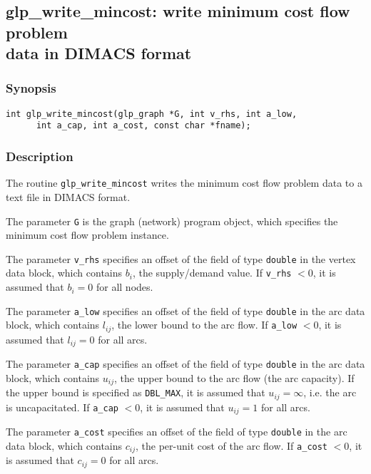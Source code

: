 \newpage

\subsection{glp\_write\_mincost: write minimum cost flow problem\\data
in DIMACS format}

\subsubsection*{Synopsis}

\begin{verbatim}
int glp_write_mincost(glp_graph *G, int v_rhs, int a_low,
      int a_cap, int a_cost, const char *fname);
\end{verbatim}

\subsubsection*{Description}

The routine \verb|glp_write_mincost| writes the minimum cost flow
problem data to a text file in DIMACS format.

The parameter \verb|G| is the graph (network) program object, which
specifies the minimum cost flow problem instance.

The parameter \verb|v_rhs| specifies an offset of the field of type
\verb|double| in the vertex data block, which contains $b_i$, the
supply/demand value. If \verb|v_rhs| $<0$, it is assumed that $b_i=0$
for all nodes.

The parameter \verb|a_low| specifies an offset of the field of type
\verb|double| in the arc data block, which contains $l_{ij}$, the lower
bound to the arc flow. If \verb|a_low| $<0$, it is assumed that
$l_{ij}=0$ for all arcs.

The parameter \verb|a_cap| specifies an offset of the field of type
\verb|double| in the arc data block, which contains $u_{ij}$, the upper
bound to the arc flow (the arc capacity). If the upper bound is
specified as \verb|DBL_MAX|, it is assumed that $u_{ij}=\infty$, i.e.
the arc is uncapacitated. If \verb|a_cap| $<0$, it is assumed that
$u_{ij}=1$ for all arcs.

The parameter \verb|a_cost| specifies an offset of the field of type
\verb|double| in the arc data block, which contains $c_{ij}$, the
per-unit cost of the arc flow. If \verb|a_cost| $<0$, it is assumed that
$c_{ij}=0$ for all arcs.

